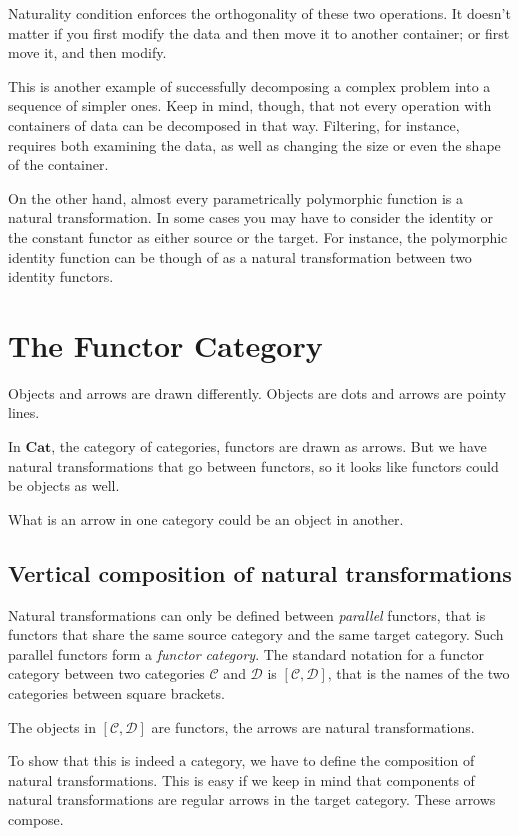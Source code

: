 \documentclass[DaoFP]{subfiles}
\begin{document}
Naturality condition enforces the orthogonality of these two operations. It doesn't matter if you first modify the data and then move it to another container; or first move it, and then modify. 

This is another example of successfully decomposing a complex problem into a sequence of simpler ones. Keep in mind, though, that not every operation with containers of data can be decomposed in that way. Filtering, for instance, requires both examining the data, as well as changing the size or even the shape of the container. 

On the other hand, almost every parametrically polymorphic function is a natural transformation. In some cases you may have to consider the identity or the constant functor as either source or the target. For instance, the polymorphic identity function can be though of as a natural transformation between two identity functors.

\section{The Functor Category}

Objects and arrows are drawn differently. Objects are dots and arrows are pointy lines.

In $\mathbf{Cat}$, the category of categories, functors are drawn as arrows. But we have natural transformations that go between functors, so it looks like functors could be objects as well. 

What is an arrow in one category could be an object in another.

\subsection{Vertical composition of natural transformations}

Natural transformations can only be defined between \emph{parallel} functors, that is functors that share the same source category and the same target category. Such parallel functors form a \emph{functor category}. The standard notation for a functor category between two categories $\mathcal{C}$ and $\mathcal{D}$ is $[\mathcal{C}, \mathcal{D}]$, that is the names of the two categories between square brackets.

The objects in $[\mathcal{C}, \mathcal{D}]$ are functors, the arrows are natural transformations. 

To show that this is indeed a category, we have to define the composition of natural transformations. This is easy if we keep in mind that components of natural transformations are regular arrows in the target category. These arrows compose.
\end{document}

